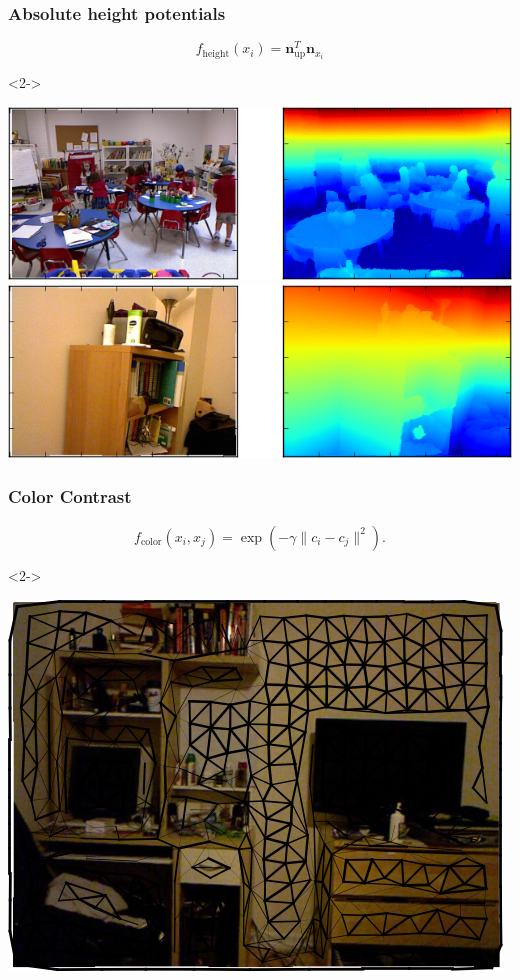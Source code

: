 \documentclass[final,ignorenonframetext,compress]{beamer}
\begin{document}
    \begin{frame}
        \frametitle{Absolute height potentials}
            \[
                f_{\text{height}}(x_i) = \textbf{n}_{\text{up}}^T \textbf{n}_{x_i}
            \]
        \begin{visibleenv}<2->
        \begin{center}
            \includegraphics[width=.6\linewidth]{images/height_success}\\
            \vspace{3mm}
            \includegraphics[width=.6\linewidth]{images/height_failure}
        \end{center}
        \end{visibleenv}

    \end{frame}


    \begin{frame}
        \frametitle{Color Contrast}
        \[
        f_\text{color}(x_i, x_j) = \exp\left(-\gamma \lVert c_i - c_j \rVert^2\right).
         \]
        \begin{visibleenv}<2->
            \begin{center}
                \includegraphics[width=.4\linewidth]{images/00062_pipline_feature_pairwise_1}
            \end{center}
        \end{visibleenv}

    \end{frame}
\end{document}
